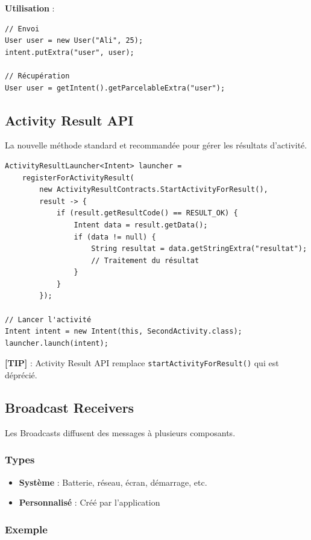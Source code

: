 \documentclass[11pt,a4paper]{article}
\begin{document}
\textbf{Utilisation} :
\begin{lstlisting}
// Envoi
User user = new User("Ali", 25);
intent.putExtra("user", user);

// Récupération
User user = getIntent().getParcelableExtra("user");
\end{lstlisting}

\subsection{Activity Result API}

La nouvelle méthode standard et recommandée pour gérer les résultats d'activité.

\begin{lstlisting}
ActivityResultLauncher<Intent> launcher =
    registerForActivityResult(
        new ActivityResultContracts.StartActivityForResult(),
        result -> {
            if (result.getResultCode() == RESULT_OK) {
                Intent data = result.getData();
                if (data != null) {
                    String resultat = data.getStringExtra("resultat");
                    // Traitement du résultat
                }
            }
        });

// Lancer l'activité
Intent intent = new Intent(this, SecondActivity.class);
launcher.launch(intent);
\end{lstlisting}

\textbf{[TIP]} : Activity Result API remplace \texttt{startActivityForResult()} qui est déprécié.

\subsection{Broadcast Receivers}

Les Broadcasts diffusent des messages à plusieurs composants.

\subsubsection{Types}

\begin{itemize}
    \item \textbf{Système} : Batterie, réseau, écran, démarrage, etc.
    \item \textbf{Personnalisé} : Créé par l'application
\end{itemize}

\subsubsection{Exemple}
\end{document}
